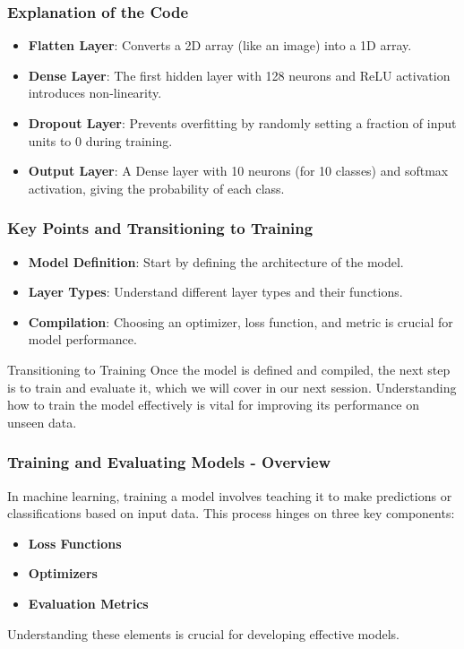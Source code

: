 \documentclass[aspectratio=169]{beamer}
\begin{document}
\begin{frame}
    \frametitle{Explanation of the Code}
    \begin{itemize}
        \item \textbf{Flatten Layer}: Converts a 2D array (like an image) into a 1D array.
        \item \textbf{Dense Layer}: The first hidden layer with 128 neurons and ReLU activation introduces non-linearity.
        \item \textbf{Dropout Layer}: Prevents overfitting by randomly setting a fraction of input units to 0 during training.
        \item \textbf{Output Layer}: A Dense layer with 10 neurons (for 10 classes) and softmax activation, giving the probability of each class.
    \end{itemize}
\end{frame}

\begin{frame}
    \frametitle{Key Points and Transitioning to Training}
    \begin{itemize}
        \item \textbf{Model Definition}: Start by defining the architecture of the model.
        \item \textbf{Layer Types}: Understand different layer types and their functions.
        \item \textbf{Compilation}: Choosing an optimizer, loss function, and metric is crucial for model performance.
    \end{itemize}
    
    \begin{block}{Transitioning to Training}
        Once the model is defined and compiled, the next step is to train and evaluate it, which we will cover in our next session.
        Understanding how to train the model effectively is vital for improving its performance on unseen data.
    \end{block}
\end{frame}

\begin{frame}[fragile]
    \frametitle{Training and Evaluating Models - Overview}
    In machine learning, training a model involves teaching it to make predictions or classifications based on input data. This process hinges on three key components:
    \begin{itemize}
        \item \textbf{Loss Functions}
        \item \textbf{Optimizers}
        \item \textbf{Evaluation Metrics}
    \end{itemize}
    Understanding these elements is crucial for developing effective models.
\end{frame}
\end{document}
